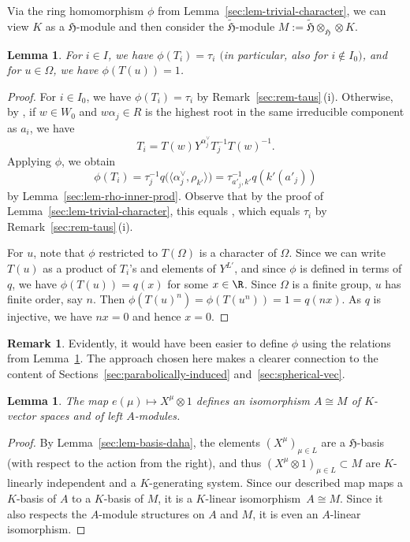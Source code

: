 \documentclass[10pt,a4paper]{amsart}
\newtheorem{Lemma}[Theorem]{Lemma}
\theoremstyle{definition}
\newtheorem{Remark}[Theorem]{Remark}
\numberwithin{equation}{section}
\begin{document}
Via the ring homomorphism $\phi$ from Lemma~\ref{sec:lem-trivial-character}, we can view $K$ as a $\mathfrak{H}$-module and then consider
the $\tilde{\mathfrak{H}}$-module $M:=\tilde{\mathfrak{H}}\otimes_{\mathfrak{H}}\otimes K$.

\begin{Lemma}\label{sec:lem-phi-values}
 For $i\in I$, we have $\phi(T_i)=\tau_i$ $($in particular, also for
 $i\not\in I_0)$, and for $u\in\Omega$, we have
$\phi(T(u))=1$.
\end{Lemma}
\begin{proof}
 For $i\in I_0$, we have $\phi(T_i)=\tau_i$ by Remark~\ref{sec:rem-taus}\,(i). Otherwise,
 by \cite[equation~(3.3.5)]{macdonald}, if $w\in W_0$ and
 $w\alpha_j\in R$ is the highest
 root in the same irreducible component as $a_i$, we have
 \[
 T_i = T(w) Y^{\alpha_j^\vee} T_j^{-1} T(w)^{-1}.
 \]
 Applying $\phi$, we obtain
 \[
 \phi(T_i) = \tau_j^{-1} q\bigl(\big\langle\alpha_j^\vee,\rho_{k'}\big\rangle\bigr)
 = \tau_{a'_j,k'}^{-1} q(k'(a'_j))
 \]
 by Lemma~\ref{sec:lem-rho-inner-prod}. Observe that by the proof of
 Lemma~\ref{sec:lem-trivial-character}, this equals
 , which equals $\tau_i$ by Remark~\ref{sec:rem-taus}\,(i).

 For $u$, note that $\phi$ restricted to $T(\Omega)$ is a character of
 $\Omega$. Since we can write $T(u)$ as a product of $T_i$'s and elements of $Y^{L'}$, and since $\phi$ is defined in terms of $q$,
 we have $\phi(T(u))=q(x)$ for some $x\in\R$. Since $\Omega$ is a finite group,
 $u$ has finite order, say $n$. Then $\phi(T(u)^n)=\phi(T(u^n))=1=q(nx)$.
 As $q$ is injective, we have $nx=0$ and hence $x=0$.
\end{proof}

\begin{Remark}
 Evidently, it would have been easier to define $\phi$ using the
 relations from Lem\-ma~\ref{sec:lem-phi-values}. The approach chosen here
 makes a clearer connection to the content of Sections~\ref{sec:parabolically-induced} and~\ref{sec:spherical-vec}.
\end{Remark}

\begin{Lemma}\label{sec:lem-induced-rep-iso}
 The map $e(\mu)\mapsto X^\mu\otimes 1$ defines an isomorphism
 $A\cong M$ of $K$-vector spaces and of left $A$-modules.
\end{Lemma}
\begin{proof}
 By Lemma~\ref{sec:lem-basis-daha}, the elements $(X^\mu)_{\mu\in L}$ are
 a $\mathfrak{H}$-basis (with respect to the action from the right),
 and thus $(X^\mu\otimes 1)_{\mu\in L}\subset M$ are $K$-linearly independent
 and a $K$-generating system. Since our described map maps a $K$-basis
 of $A$ to a $K$-basis of $M$, it is a $K$-linear isomorphism~${A\cong M}$. Since it also respects the $A$-module structures on $A$ and
 $M$, it is even an $A$-linear isomorphism.
\end{proof}
\end{document}
